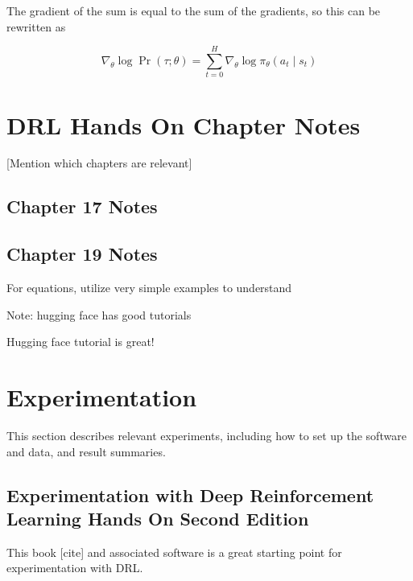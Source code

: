 \documentclass[acmlarge,screen]{acmart}
\begin{document}
\noindent The gradient of the sum is equal to the sum of the gradients, so this can be rewritten as

\begin{equation}
  \nabla_\theta \log \Pr (\tau; \theta) =  \sum_{t=0}^H \nabla_\theta \log \pi_\theta (a_t \mid s_t)
\label{eq:policygradienttheoryderivation10}
\end{equation}













\section{DRL Hands On Chapter Notes}

[Mention which chapters are relevant]

\subsection{Chapter 17 Notes}


\subsection{Chapter 19 Notes}

For equations, utilize very simple examples to understand


Note:  hugging face has good tutorials

Hugging face tutorial is great!





\section{Experimentation}

This section describes relevant experiments, including how to set up the software and data, and result summaries.

\subsection{Experimentation with Deep Reinforcement Learning Hands On Second Edition}

This book [cite] and associated software is a great starting point for experimentation with DRL.
\end{document}
